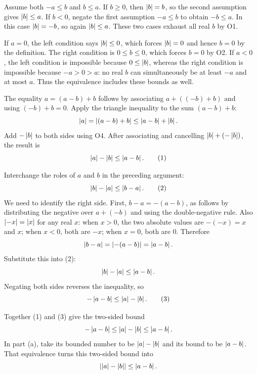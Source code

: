 Assume both $-a\le b$ and $b\le a$.
If $b\ge0$, then $\left|b\right|=b$, so the second assumption gives
$\left|b\right|\le a$.
If $b<0$, negate the first assumption $-a\le b$ to obtain
$-b\le a$. In this case $\left|b\right|=-b$, so again $\left|b\right|\le a$.
These two cases exhaust all real $b$ by O1.

If $a=0$, the left condition says $\left|b\right|\le0$, which forces
$\left|b\right|=0$ and hence $b=0$ by the definition. The right condition is
$0\le b\le0$, which forces $b=0$ by O2.
If $a<0$, the left condition is impossible because
$0\le\left|b\right|$, whereas the right condition is impossible because
$-a>0>a$: no real $b$ can simultaneously be at least $-a$ and at most
$a$. Thus the equivalence includes these bounds as well.


The equality $a=(a-b)+b$ follows by associating $a+((-b)+b)$ and
using $(-b)+b=0$. Apply the triangle inequality to the sum $(a-b)+b$:
\[
 \left|a\right|=\left|(a-b)+b\right|\le\left|a-b\right|+\left|b\right|.
\]
Add $-\left|b\right|$ to both sides using O4. After associating and cancelling
$\left|b\right|+(-\left|b\right|)$, the result is
\[
 \left|a\right|-\left|b\right|\le\left|a-b\right|. \tag{1}
\]

Interchange the roles of $a$ and $b$ in the preceding argument:
\[
 \left|b\right|-\left|a\right|\le\left|b-a\right|. \tag{2}
\]
We need to identify the right side. First, $b-a=-(a-b)$, as follows by
distributing the negative over $a+(-b)$ and using the double-negative
rule. Also $\left|-x\right|=\left|x\right|$ for any real $x$: when $x>0$, the two
absolute values are $-(-x)=x$ and $x$; when $x<0$, both are $-x$;
when $x=0$, both are $0$. Therefore
\[
 \left|b-a\right|=\left|-(a-b)\right|=\left|a-b\right|.
\]
Substitute this into (2):
\[
 \left|b\right|-\left|a\right|\le\left|a-b\right|.
\]
Negating both sides reverses the inequality, so
\[
 -\left|a-b\right|\le\left|a\right|-\left|b\right|. \tag{3}
\]

Together (1) and (3) give the two-sided bound
\[
 -\left|a-b\right|\le\left|a\right|-\left|b\right|\le\left|a-b\right|.
\]
In part (a), take its bounded number to be
$\left|a\right|-\left|b\right|$ and its bound to be $\left|a-b\right|$. That equivalence
turns this two-sided bound into
\[
 \left|\left|a\right|-\left|b\right|\right|\le\left|a-b\right|.
\]


